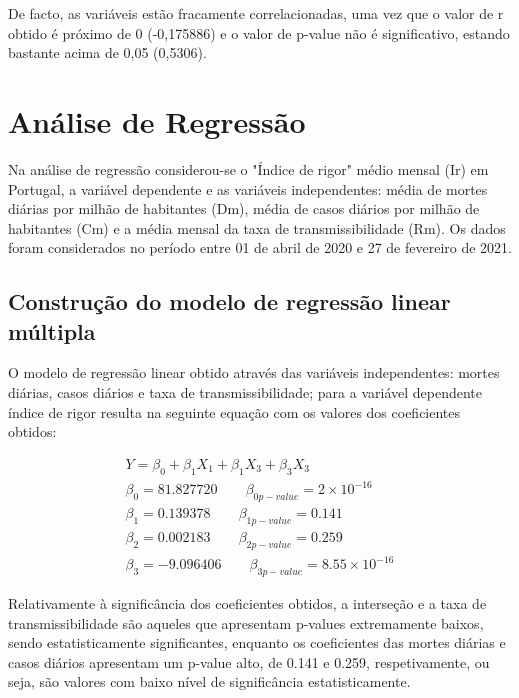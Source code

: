 \documentclass[conference]{IEEEtran}
\begin{document}
De facto, as variáveis estão fracamente correlacionadas, uma vez que o valor de r obtido é próximo de 0 (-0,175886) e o valor de p-value não é significativo, estando bastante acima de 0,05 (0,5306).


\section{Análise de Regressão} %
Na análise de regressão considerou-se o "Índice de rigor" médio mensal (Ir) em Portugal, a variável dependente e as variáveis independentes: média de mortes diárias por milhão de habitantes (Dm), média de casos diários por milhão de habitantes (Cm) e a média mensal da taxa de transmissibilidade (Rm). Os dados foram considerados no período entre 01 de abril de 2020 e 27 de fevereiro de 2021.

\subsection{Construção do modelo de regressão linear múltipla}

O modelo de regressão linear obtido através das variáveis independentes: mortes diárias, casos diários e taxa de transmissibilidade; para a variável dependente índice de rigor resulta na seguinte equação com os valores dos coeficientes obtidos:

\begin{equation}
\begin{array}{l}
	Y=\beta _{0}+\beta _{1}X_{1}+\beta _{1}X_{3}+\beta _{3}X_{3} \\
	\beta _{0}=81.827720 \qquad \beta _{0 p-value}=2\times 10^{-16} \\
	\beta _{1}=0.139378 \qquad \beta _{1 p-value}=0.141 \\
	\beta _{2}=0.002183 \qquad \beta _{2 p-value}=0.259 \\
	\beta _{3}=-9.096406 \qquad \beta _{3 p-value}=8.55\times 10^{-16}
\end{array}
\end{equation}

Relativamente à significância dos coeficientes obtidos, a interseção e a taxa de transmissibilidade são aqueles que apresentam p-values extremamente  baixos, sendo estatisticamente significantes, enquanto os coeficientes das mortes diárias e casos diários apresentam um p-value alto, de 0.141 e 0.259, respetivamente, ou seja, são valores com baixo nível de significância estatisticamente.
\end{document}
